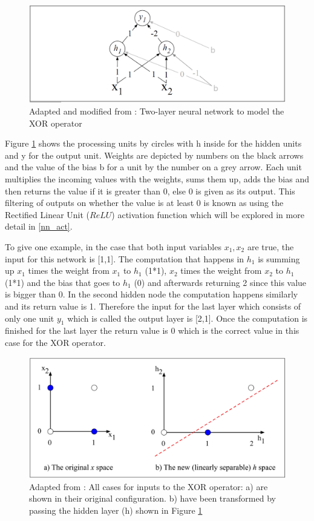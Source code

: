 \begin{figure}
  \includegraphics[width=\linewidth]{Pictures/Jurafsky_21_XOR_2.png}
  \caption{Adapted and modified from \citet{jurafsky2021}: Two-layer neural network to model the XOR operator}
  \label{fig:XOR2}
\end{figure}


Figure \ref{fig:XOR2} shows the processing units by circles with h inside for the hidden units and y for the output unit.
Weights are depicted by numbers on the black arrows and the value of the bias b for a unit by the number on a grey arrow.
Each unit multiplies the incoming values with the weights, sums them up, adds the bias and then returns the value if it is greater than 0, else 0 is given as its output. 
This filtering of outputs on whether the value is at least 0 is known as using the Rectified Linear Unit ($ReLU$) activation function which will be explored in more detail in \ref{nn_act}.

To give one example, in the case that both input variables $x_1,x_2$ are true, the input for this network is [1,1]. 
The computation that happens in $h_1$ is summing up $x_1$ times the weight from $x_1$ to $h_1$ (1*1), $x_2$ times the weight from $x_2$ to $h_1$ (1*1) and 
the bias that goes to $h_1$ (0) and afterwards returning 2 since this value is bigger than 0. 
In the second hidden node the computation happens similarly and its return value is 1. 
Therefore the input for the last layer which consists of only one unit $y_1$ which is called the output layer is [2,1]. 
Once the computation is finished for the last layer the return value is 0 which is the correct value in this case for the XOR operator. 

\begin{figure}
  \includegraphics[width=\linewidth]{Pictures/Jurafsky_21_XOR_3.png}
  \caption{Adapted from \citet{jurafsky2021}: All cases for inputs to the XOR operator: a) are shown in their original configuration. b) have been transformed by passing the hidden layer (h) shown in Figure \ref{fig:XOR2}}
  \label{fig:XOR3}
\end{figure}

